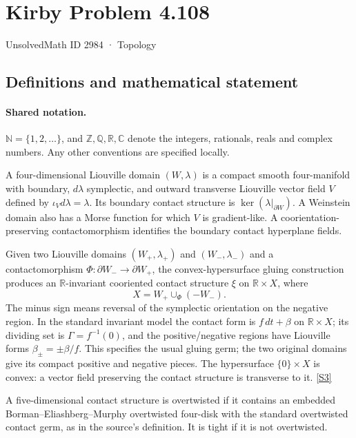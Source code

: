 \documentclass[11pt]{article}
\newcommand{\sref}[2]{\hyperlink{source:#1:#2}{[S#2]}}
\begin{document}
\setcounter{section}{2983}
\section{Kirby Problem 4.108}\label{2984}
{\small\sffamily UnsolvedMath ID 2984 · Topology}
\subsection{Definitions and mathematical statement}

\paragraph{Shared notation.}$\mathbb N=\{1,2,\ldots\}$, and $\mathbb Z,\mathbb Q,\mathbb R,\mathbb C$ denote the integers, rationals, reals and complex numbers. Any other conventions are specified locally.


A four-dimensional Liouville domain $(W,\lambda)$ is a compact smooth four-manifold with boundary, $d\lambda$ symplectic, and outward transverse Liouville vector field $V$ defined by $\iota_Vd\lambda=\lambda$. Its boundary contact structure is $\ker(\lambda|_{\partial W})$. A Weinstein domain also has a Morse function for which $V$ is gradient-like. A coorientation-preserving contactomorphism identifies the boundary contact hyperplane fields.

Given two Liouville domains $(W_+,\lambda_+)$ and $(W_-,\lambda_-)$ and a contactomorphism $\Phi:\partial W_-\to\partial W_+$, the convex-hypersurface gluing construction produces an $\mathbb R$-invariant cooriented contact structure $\xi$ on $\mathbb R\times X$, where
\[
X=W_+\cup_\Phi(-W_-).
\]
The minus sign means reversal of the symplectic orientation on the negative region. In the standard invariant model the contact form is $f\,dt+\beta$ on $\mathbb R\times X$; its dividing set is $\Gamma=f^{-1}(0)$, and the positive/negative regions have Liouville forms $\beta_\pm=\pm\beta/f$. This specifies the usual gluing germ; the two original domains give its compact positive and negative pieces. The hypersurface $\{0\}\times X$ is convex: a vector field preserving the contact structure is transverse to it. \sref{2984}{3}

A five-dimensional contact structure is overtwisted if it contains an embedded Borman--Eliashberg--Murphy overtwisted four-disk with the standard overtwisted contact germ, as in the source's definition. It is tight if it is not overtwisted.
\end{document}
